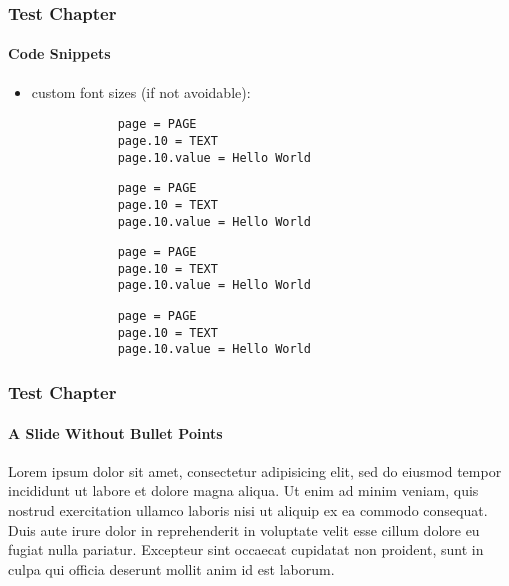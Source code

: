 \begin{frame}[fragile]
	\frametitle{Test Chapter}
	\framesubtitle{Code Snippets}

	\begin{itemize}
		\item custom font sizes (if not avoidable):

		\lstset{
			basicstyle=\large\selectfont\ttfamily
		}

		\begin{lstlisting}
			page = PAGE
			page.10 = TEXT
			page.10.value = Hello World
		\end{lstlisting}

		\lstset{
			basicstyle=\small\selectfont\ttfamily
		}

		\begin{lstlisting}
			page = PAGE
			page.10 = TEXT
			page.10.value = Hello World
		\end{lstlisting}


		\begin{lstlisting}
			page = PAGE
			page.10 = TEXT
			page.10.value = Hello World
		\end{lstlisting}

		\lstset{
			basicstyle=\tiny\ttfamily
		}

		\begin{lstlisting}
			page = PAGE
			page.10 = TEXT
			page.10.value = Hello World
		\end{lstlisting}

	\end{itemize}


\end{frame}


\begin{frame}
	\frametitle{Test Chapter}
	\framesubtitle{A Slide Without Bullet Points}

	Lorem ipsum dolor sit amet, consectetur adipisicing elit, sed do eiusmod
	tempor incididunt ut labore et dolore magna aliqua. Ut enim ad minim veniam,
	quis nostrud exercitation ullamco laboris nisi ut aliquip ex ea commodo
	consequat. Duis aute irure dolor in reprehenderit in voluptate velit esse
	cillum dolore eu fugiat nulla pariatur. Excepteur sint occaecat cupidatat
	non proident, sunt in culpa qui officia deserunt mollit anim id est laborum.

	\breakingchange

\end{frame}

